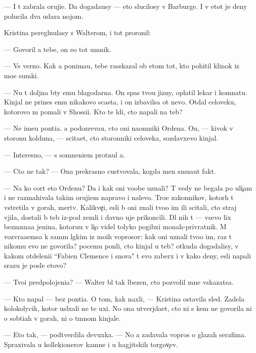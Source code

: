 \documentclass[10pt]{book}
\begin{document}
— I t{\yi} zabrala oruji{\y}e. Da{\y} dogada{\y}usy — eto slucilosy v Barburge. I v etot je deny polucila dva udara nojom.

Kristina peregl{\ia}nulasy s Walterom, i tot proronil:

— Govoril {\y}a tebe, on {\y}e{\x}o tot umnik.

— Vs{\e} verno. Kak {\y}a ponima{\y}u, tebe rasskazal ob etom tot, kto pohitil klinok iz mo{\y}e{\y} sumki.

— Nu t{\yi} doljna b{\yi}ty {\y}emu blagodarna. On spas tvo{\y}u jizny, oplatil lekar{\ia} i komnatu. Kinjal ne prines {\y}emu nikakovo scast{\y}a, i on izbavilsa ot nevo. Otdal celoveku, kotorovo m{\yi} po{\y}mali v Shossi{\y}i. Kto te l{\iu}di, cto napali na teb{\ia}?

— Ne ime{\y}u pon{\ia}ti{\y}a. {\Y}a podozreva{\y}u, cto oni na{\y}omniki Ordena. On, — kivok v storonu kolduna, — scita{\y}et, cto storonniki celoveka, sozdavxevo kinjal.

— Interesno, — s somneni{\y}em prot{\ia}nul {\y}a.

— Cto ne tak? — Ona prekrasno custvovala, kogda men{\ia} smu{\x}a{\y}ut fakt{\yi}.

— Na ko{\y} cort eto Ordenu? Da i kak oni voob{\x}e uznali? T{\yi} vedy ne begala po uli{\c}am i ne razmahivala takim oruji{\y}em napravo i nalevo. Tro{\y}e zakonnikov, kotor{\yi}h t{\yi} vstretila v gorah, mertv{\yi}. Kalikve{\c}i, {\y}esli b{\yi} oni znali tvo{\y}o im{\ia} ili scitali, cto straj v{\yi}jila, dostali b{\yi} teb{\ia} iz-pod zemli i davno uje prikoncili. Dl{\ia} nih t{\yi} — vsevo lix bez{\yi}m{\ia}nna{\y}a jen{\x}ina, kotoru{\y}u v li{\c}o videl tolyko pogibxi{\y} monah-privratnik. M{\yi} vozvra{\x}a{\y}emsa k sam{\yi}m l{\e}gkim iz mo{\y}ih voprosov: kak oni uznali tvo{\y}o im{\ia}, raz t{\yi} nikomu {\y}evo ne govorila? pocemu pon{\ia}li, cto kinjal u teb{\ia}? otkuda dogadalisy, v kakom otdeleni{\y}i ``Fabien Clemence i s{\yi}nov{\y}a" t{\yi} {\y}evo zaber{\e}x i v kako{\y} deny, {\y}esli napali srazu je posle etovo?

— Tvo{\y}i predpolojeni{\y}a? — Walter b{\yi}l tak l{\iu}bezen, cto pozvolil mne v{\yi}skazatsa.

— Kto napal — bez pon{\ia}ti{\y}a. O tom, kak naxli, — Kristina ostavila sled{\yi}. Zadela kolokolycik, kotor{\yi}{\y} usl{\yi}xali ne te uxi. No ona utverjda{\y}et, cto ni s kem ne govorila ni o sob{\yi}ti{\y}ah v gorah, ni o t{\e}mnom kinjale.

— Eto tak, — podtverdila devuxka. — No {\y}a zadavala vopros{\yi} o glazah serafima. Spraxivala u kollek{\c}ionerov kamne{\y} i u hagjitskih torgov{\c}ev.
\end{document}

